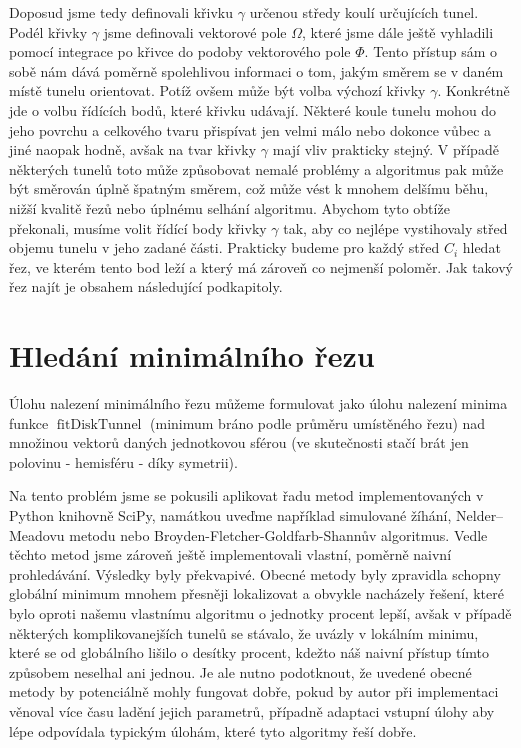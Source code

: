 Doposud jsme tedy definovali křivku $ \gamma $ určenou středy koulí určujících
tunel. Podél křivky $ \gamma $ jsme definovali vektorové pole $ \Omega $, které
jsme dále ještě vyhladili pomocí integrace po křivce do podoby vektorového
pole $ \Phi $. Tento přístup sám o sobě nám dává poměrně spolehlivou informaci
o tom, jakým směrem se v daném místě tunelu orientovat. Potíž ovšem
může být volba výchozí křivky $ \gamma $. Konkrétně jde o volbu řídících bodů,
které křivku udávají. Některé koule tunelu mohou do jeho povrchu a celkového
tvaru přispívat jen velmi málo nebo dokonce vůbec a jiné naopak hodně, avšak na tvar
křivky $ \gamma $ mají vliv prakticky stejný. V případě některých tunelů
toto může způsobovat nemalé problémy a algoritmus pak může být směrován úplně
špatným směrem, což může vést k mnohem delšímu běhu, nižší kvalitě řezů nebo
úplnému selhání algoritmu. Abychom tyto obtíže překonali, musíme volit
řídící body křivky $ \gamma $ tak, aby co nejlépe vystihovaly střed objemu
tunelu v jeho zadané části. Prakticky budeme pro každý střed $ C_i $ hledat řez,
ve kterém tento bod leží a který má zároveň co nejmenší poloměr. Jak takový
řez najít je obsahem následující podkapitoly.






\section{Hledání minimálního řezu} \label{subsec:min_cut}
Úlohu nalezení minimálního řezu můžeme formulovat jako úlohu nalezení minima
funkce $ \operatorname{fitDiskTunnel} $ (minimum bráno podle průměru umístěného řezu)
nad množinou vektorů daných jednotkovou sférou (ve skutečnosti stačí brát
jen polovinu - hemisféru - díky symetrii).

Na tento problém jsme se pokusili aplikovat řadu metod implementovaných v Python
knihovně SciPy, namátkou uveďme například simulované žíhání, Nelder–Meadovu metodu
nebo Broyden-Fletcher-Goldfarb-Shannův algoritmus. Vedle těchto metod jsme zároveň
ještě implementovali vlastní, poměrně naivní prohledávání. Výsledky byly
překvapivé. Obecné metody byly zpravidla schopny globální minimum mnohem přesněji
lokalizovat a obvykle nacházely řešení, které bylo oproti našemu vlastnímu
algoritmu o jednotky procent lepší, avšak v případě některých komplikovanejších
tunelů se stávalo, že uvázly v lokálním minimu, které se od globálního lišilo
o desítky procent, kdežto náš naivní přístup tímto způsobem neselhal ani jednou.
Je ale nutno podotknout, že uvedené obecné metody by potenciálně mohly fungovat
dobře, pokud by autor při implementaci věnoval více času ladění jejich parametrů,
případně adaptaci vstupní úlohy aby lépe odpovídala typickým úlohám, které tyto
algoritmy řeší dobře.


